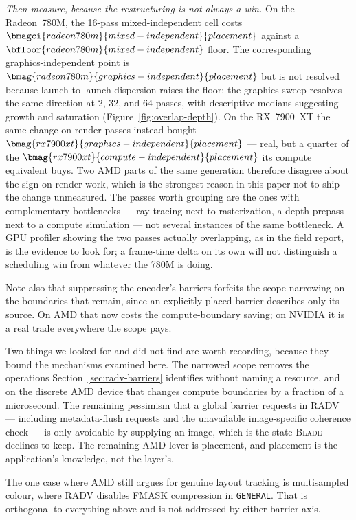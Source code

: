 \documentclass[10pt,twocolumn]{article}
\newcommand{\blade}{\textsc{Blade}}
\begin{document}
\emph{Then measure, because the restructuring is not always a win.} On the
Radeon~780M, the 16-pass mixed-independent cell costs
$\bmagci{radeon780m}{mixed-independent}{placement}$ against a
$\bfloor{radeon780m}{mixed-independent}$ floor. The corresponding
graphics-independent point is
$\bmag{radeon780m}{graphics-independent}{placement}$ but is not resolved
because launch-to-launch dispersion raises the floor; the graphics sweep resolves
the same direction at 2, 32, and 64 passes, with descriptive medians suggesting
growth and saturation (Figure~\ref{fig:overlap-depth}). On the RX~7900~XT the
same change on render passes instead bought
$\bmag{rx7900xt}{graphics-independent}{placement}$ --- real, but a quarter of
the $\bmag{rx7900xt}{compute-independent}{placement}$ its compute equivalent
buys. Two AMD parts of the same generation therefore disagree about the sign
on render work, which is the strongest reason in this paper not to ship the
change unmeasured. The passes worth grouping are the ones with
complementary bottlenecks --- ray tracing next to rasterization, a depth
prepass next to a compute simulation --- not several instances of the same
bottleneck. A GPU profiler showing the two passes actually overlapping, as in
the field report, is the evidence to look for; a frame-time delta on its own
will not distinguish a scheduling win from whatever the 780M is doing.

Note also that suppressing the encoder's barriers forfeits the scope narrowing
on the boundaries that remain, since an explicitly placed barrier describes
only its source. On AMD that now costs the compute-boundary saving; on NVIDIA
it is a real trade everywhere the scope pays.

Two things we looked for and did not find are worth recording, because they
bound the mechanisms examined here. The narrowed scope removes the operations
Section~\ref{sec:radv-barriers} identifies without naming a resource, and on
the discrete AMD device that changes compute boundaries by a fraction of a
microsecond. The remaining pessimism that a global barrier requests in RADV
--- including metadata-flush requests and the unavailable image-specific
coherence check --- is only avoidable by supplying an image, which is the state
\blade{} declines to keep. The remaining AMD lever is placement, and placement
is the application's knowledge, not the layer's.

The one case where AMD still argues for genuine layout tracking is
multisampled colour, where RADV disables FMASK compression in
\texttt{GENERAL}. That is orthogonal to everything above and is not addressed
by either barrier axis.
\end{document}
